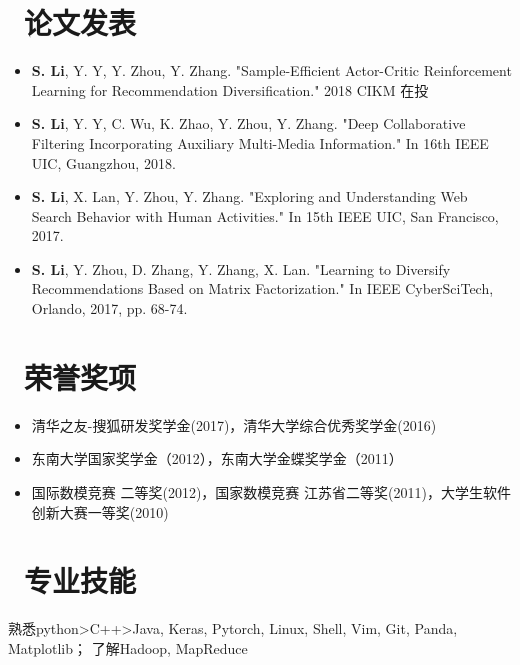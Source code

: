 \documentclass{resume}
\begin{document}
\section{\faBook\ 论文发表}
\begin{itemize}
	\item \textbf{S. Li}, Y. Y, Y. Zhou, Y. Zhang. "Sample-Efficient Actor-Critic Reinforcement Learning for Recommendation Diversification." 2018 CIKM 在投
	\item \textbf{S. Li}, Y. Y, C. Wu, K. Zhao, Y. Zhou, Y. Zhang. "Deep Collaborative Filtering Incorporating Auxiliary Multi-Media Information." In 16th IEEE UIC, Guangzhou, 2018.
	\item \textbf{S. Li}, X. Lan, Y. Zhou, Y. Zhang. "Exploring and Understanding Web Search Behavior with Human Activities." In 15th IEEE UIC, San Francisco, 2017.
	\item \textbf{S. Li}, Y. Zhou, D. Zhang, Y. Zhang, X. Lan. "Learning to Diversify Recommendations Based on Matrix Factorization." In IEEE CyberSciTech, Orlando, 2017, pp. 68-74.
\end{itemize}

\section{\faTrophy\ 荣誉奖项}
\begin{itemize}[parsep=0.5ex]
	\item 清华之友-搜狐研发奖学金(2017)，清华大学综合优秀奖学金(2016) 
	\item 东南大学国家奖学金（2012），东南大学金蝶奖学金（2011）
	\item 国际数模竞赛 二等奖(2012)，国家数模竞赛 江苏省二等奖(2011)，大学生软件创新大赛一等奖(2010)
\end{itemize}

\section{\faCogs\ 专业技能}
熟悉python>C++>Java, Keras, Pytorch, Linux, Shell, Vim, Git, Panda, Matplotlib； 了解Hadoop, MapReduce
\end{document}
